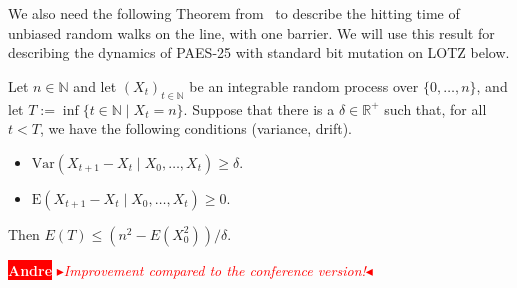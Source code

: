 \documentclass[
sigconf = false, %
review = false, %
screen = true, %
anonymous = true, %
format=acmsmall
]{acmart}
\newcommand{\LOTZ}{\textsc{LOTZ}\xspace}
\newcommand*{\E}{\mathrm{E}}
\newcommand{\PAES}{PAES-25\xspace}
\newcommand{\nbc}[3]{
		{\colorbox{#3}{\bfseries\sffamily\scriptsize\textcolor{white}{#1}}}
		{\textcolor{#3}{\sf\small$\blacktriangleright$\textit{#2}$\blacktriangleleft$}}
}
\newcommand{\andre}[1]{\nbc{Andre}{#1}{red}}
\begin{document}
We also need the following Theorem from~\cite{kötzing2024theorystochasticdrift} to describe the hitting time of unbiased random walks on the line, with one barrier. We will use this result for describing the dynamics of \PAES with standard bit mutation on \LOTZ below.

\begin{theorem}
\label{thm:unbiased-random-walk}
    Let $n \in \mathbb{N}$ and let $(X_t)_{t \in \mathbb{N}}$ be an integrable random process over $\{0, \ldots , n\}$, and let $T:=\inf\{t \in \mathbb{N} \mid X_t = n\}$. Suppose that there is a $\delta \in \mathbb{R}^+$ such that, for all $t<T$, we have the following conditions (variance, drift).
    \begin{itemize}
        \item[(1)]
        $\text{Var}(X_{t+1}-X_t \mid X_0, \ldots , X_t) \geq \delta$.
        \item[(2)]
        $\E(X_{t+1}-X_t \mid X_0, \ldots , X_t) \geq 0$.
    \end{itemize}
Then $E(T) \leq (n^2-E(X_0^2))/\delta$.
\end{theorem}
\andre{Improvement compared to the conference version!}
\end{document}

